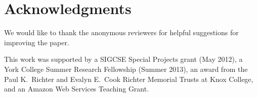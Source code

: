 \documentclass{sig-alternate}
\begin{document}
%
%
%
%
%
%
%
%

\section{Acknowledgments}

We would like to thank the anonymous reviewers for helpful suggestions
for improving the paper.

This work was supported by a SIGCSE Special Projects grant (May 2012),
a York College Summer Research Fellowship (Summer 2013), an award from
the Paul K.\ Richter and Evalyn E.\ Cook Richter Memorial Trusts at Knox
College, and an Amazon Web Services Teaching Grant.


  

\end{document}
